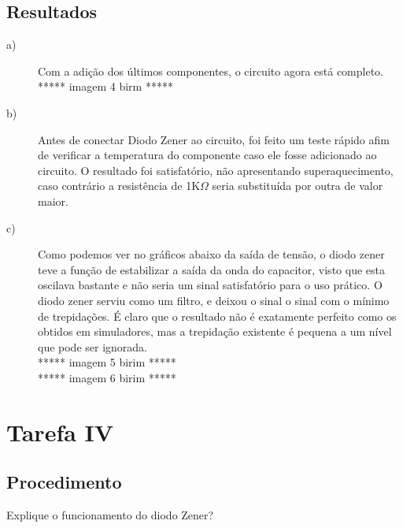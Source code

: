 \subsection{Resultados}
\begin{description}
	\item[a)] Com a adição dos últimos componentes, o circuito agora está completo.\\
	***** imagem 4 birm *****\\
	\item[b)] Antes de conectar Diodo Zener ao circuito, foi feito um teste rápido afim de verificar a temperatura do componente caso ele fosse adicionado ao circuito. O resultado foi satisfatório, não apresentando superaquecimento, caso contrário a resistência de 1K$\Omega$ seria substituída por outra de valor maior.
	\item[c)] Como podemos ver no gráficos abaixo da saída de tensão, o diodo zener teve a função de estabilizar a saída da onda do capacitor, visto que esta oscilava bastante e não seria um sinal satisfatório para o uso prático. O diodo zener serviu como um filtro, e deixou o sinal o sinal com o mínimo de trepidações. É claro que o resultado não é exatamente perfeito como os obtidos em simuladores, mas a trepidação existente é pequena a um nível que pode ser ignorada.\\
	***** imagem 5 birim *****\\
	***** imagem 6 birim *****
\end{description}

\section{Tarefa IV}
\subsection{Procedimento}
Explique o funcionamento do diodo Zener?
